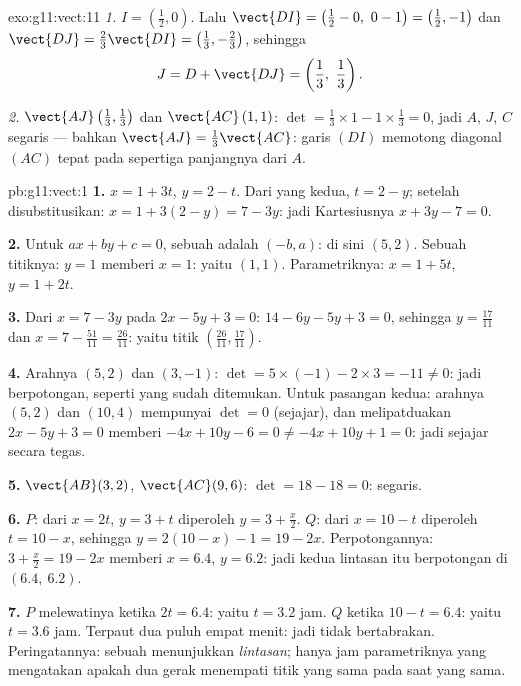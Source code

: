\begin{solution}{exo:g11:vect:11}
\emph{1.} $I = \left(\frac12, 0\right)$. Lalu
$\vect{DI} = \left(\frac12 - 0,\ 0 - 1\right) = \left(\frac12, -1\right)$
dan $\vect{DJ} = \frac23\vect{DI} = \left(\frac13, -\frac23\right)$, sehingga
\[
J = D + \vect{DJ} = \left(\frac13,\ \frac13\right).
\]

\emph{2.} $\vect{AJ}\left(\frac13, \frac13\right)$ dan
$\vect{AC}\,(1, 1)$:
$\det = \frac13 \times 1 - 1 \times \frac13 = 0$, jadi $A$, $J$, $C$
segaris --- bahkan $\vect{AJ} = \frac13\vect{AC}$: garis $(DI)$ memotong
diagonal $(AC)$ tepat pada sepertiga panjangnya dari $A$.
\end{solution}

\begin{solution}{pb:g11:vect:1}
\textbf{1.} $x = 1 + 3t$, $y = 2 - t$. Dari yang kedua,
$t = 2 - y$; setelah disubstitusikan: $x = 1 + 3(2 - y) = 7 - 3y$:
jadi  Kartesiusnya $x + 3y - 7 = 0$.

\textbf{2.} Untuk $ax + by + c = 0$, sebuah  adalah
$(-b, a)$: di sini $(5, 2)$. Sebuah titiknya: $y = 1$ memberi $x = 1$:
yaitu $(1, 1)$. Parametriknya: $x = 1 + 5t$, $y = 1 + 2t$.

\textbf{3.} Dari $x = 7 - 3y$ pada $2x - 5y + 3 = 0$:
$14 - 6y - 5y + 3 = 0$, sehingga $y = \frac{17}{11}$ dan
$x = 7 - \frac{51}{11} = \frac{26}{11}$: yaitu titik
$\left(\frac{26}{11}, \frac{17}{11}\right)$.

\textbf{4.} Arahnya $(5, 2)$ dan $(3, -1)$:
$\det = 5 \times (-1) - 2 \times 3 = -11 \neq 0$: jadi berpotongan,
seperti yang sudah ditemukan. Untuk pasangan kedua: arahnya $(5, 2)$ dan
$(10, 4)$ mempunyai $\det = 0$ (sejajar), dan melipatduakan
$2x - 5y + 3 = 0$ memberi $-4x + 10y - 6 = 0 \neq -4x + 10y + 1
= 0$: jadi sejajar secara tegas.

\textbf{5.} $\vect{AB}(3, 2)$, $\vect{AC}(9, 6)$:
$\det = 18 - 18 = 0$: segaris.

\textbf{6.} $P$: dari $x = 2t$, $y = 3 + t$ diperoleh $y = 3 +
\frac x2$. $Q$: dari $x = 10 - t$ diperoleh $t = 10 - x$, sehingga
$y = 2(10 - x) - 1 = 19 - 2x$. Perpotongannya:
$3 + \frac x2 = 19 - 2x$ memberi $x = 6.4$, $y = 6.2$: jadi kedua lintasan
itu berpotongan di $(6.4,\ 6.2)$.

\textbf{7.} $P$ melewatinya ketika $2t = 6.4$: yaitu $t = 3.2$ jam. $Q$
ketika $10 - t = 6.4$: yaitu $t = 3.6$ jam. Terpaut dua puluh empat menit:
jadi tidak bertabrakan. Peringatannya: sebuah  menunjukkan
\emph{lintasan}; hanya jam parametriknya yang mengatakan apakah dua gerak
menempati titik yang sama pada saat yang sama.


\end{solution}
